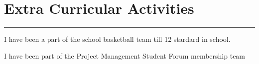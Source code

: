 \documentclass[]{../../rahulworld-resume}
\begin{document}
\begin{minipage}[t]{0.57\textwidth}
\section{Extra Curricular Activities} %
\noindent\rule{11cm}{0.4pt}
 
\descript{}
\noindent
\hspace{5em}%
\begin{minipage}{0.85\textwidth\vspace{5pt}}
I have been a part of the school basketball team till 12 stardard in school.
\end{minipage}
 
\noindent
\hspace{5em}%
\begin{minipage}{0.85\textwidth\vspace{5pt}}
I have been part of the Project Management Student Forum membership team
\end{minipage}
\end{minipage} 
\end{document}
